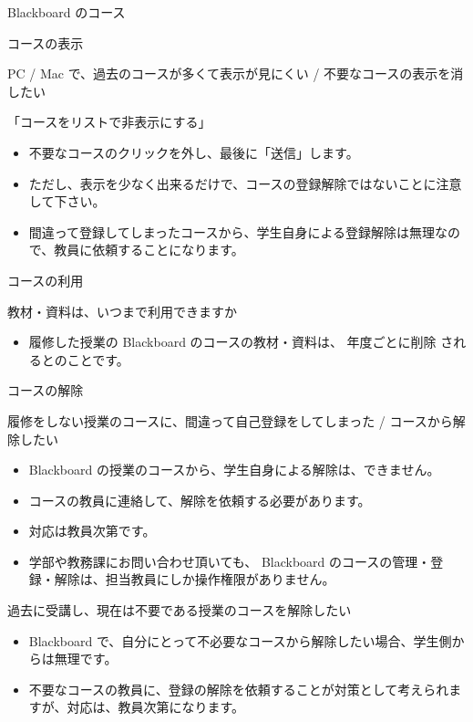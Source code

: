 \documentclass[a4j,10pt]{jsarticle}
\def\lthtmlcheckvsize{\ifdim\ht\sizebox<\vsize 
  \ifdim\wd\sizebox<\hsize\expandafter\hfill\fi \expandafter\vfill
  \else\expandafter\vss\fi}%
\begin{document}
{\begin{frame}[label={sec:orgda0915a},fragile]{Blackboard のコース}
\begin{block}{コースの表示}
\begin{block}{PC / Mac で、過去のコースが多くて表示が見にくい / 不要なコースの表示を消したい}
\begin{block}{「コースをリストで非表示にする」}
\begin{itemize}
\item 不要なコースのクリックを外し、最後に「送信」します。
\item ただし、表示を少なく出来るだけで、コースの登録解除ではないことに注意して下さい。
\item 間違って登録してしまったコースから、学生自身による登録解除は無理なので、教員に依頼することになります。
\end{itemize}
\end{block}
\end{block}
\end{block}
\par
\begin{block}{コースの利用}
\begin{block}{教材・資料は、いつまで利用できますか}
\begin{itemize}
\item 履修した授業の Blackboard のコースの教材・資料は、 \alert{年度ごとに削除} されるとのことです。
\end{itemize}
\end{block}
\end{block}
\par
\begin{block}{コースの解除}
\begin{block}{履修をしない授業のコースに、間違って自己登録をしてしまった / コースから解除したい}
\begin{itemize}
\item Blackboard の授業のコースから、学生自身による解除は、できません。
\item コースの教員に連絡して、解除を依頼する必要があります。
\item 対応は教員次第です。
\item 学部や教務課にお問い合わせ頂いても、 Blackboard のコースの管理・登録・解除は、担当教員にしか操作権限がありません。
\end{itemize}
\end{block}
\par
\begin{block}{過去に受講し、現在は不要である授業のコースを解除したい}
\begin{itemize}
\item Blackboard で、自分にとって不必要なコースから解除したい場合、学生側からは無理です。
\item 不要なコースの教員に、登録の解除を依頼することが対策として考えられますが、対応は、教員次第になります。
\end{itemize}
\end{block}
\end{block}
\end{frame}%
\lthtmlfigureZ
\lthtmlcheckvsize\clearpage}
\end{document}
